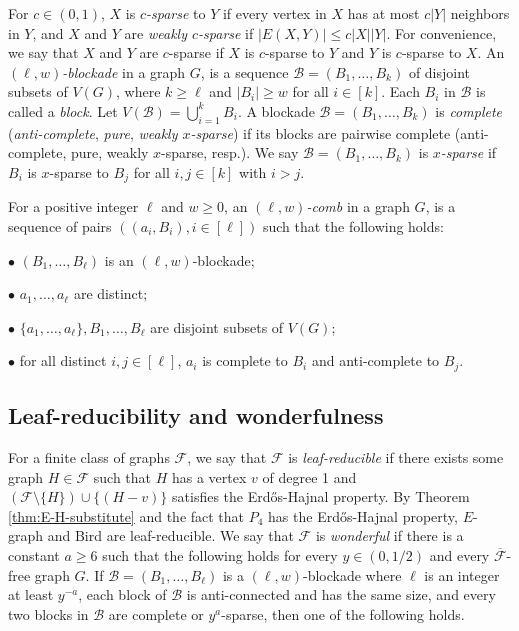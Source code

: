 \documentclass[a4paper,11pt]{article}
\begin{document}
For $c\in(0,1)$, $X$ is {\em $c$-sparse} to $Y$ if every vertex in $X$ has at most $c|Y|$ neighbors in $Y$, and $X$ and $Y$ are {\em weakly $c$-sparse} if $|E(X,Y)|\leq c|X||Y|$. 
For convenience, we say that $X$ and $Y$ are $c$-sparse if $X$ is $c$-sparse to $Y$ and $Y$ is $c$-sparse to $X$.
An {\em $(\ell,w)$-blockade} in a graph $G$, is a sequence $\mathcal{B}=(B_1,\ldots,B_k)$ of disjoint subsets of $V(G)$, where $k\geq \ell$ and $|B_i|\geq w$ for all $i\in[k]$. 
Each $B_i$ in  $\mathcal{B}$ is called a {\em block}.
Let $V(\mathcal{B})=\bigcup_{i=1}^{k} B_i$.
A blockade $\mathcal{B}=(B_1,\ldots,B_k)$ is {\em complete} ({\em anti-complete}, {\em pure}, {\em weakly $x$-sparse}) if its blocks are pairwise complete (anti-complete, pure, weakly $x$-sparse, resp.). 
We say $\mathcal{B}=(B_1,\ldots,B_k)$ is {\em $x$-sparse} if $B_i$ is $x$-sparse to $B_j$ for all $i,j\in[k]$ with $i>j$.

For a positive integer $\ell$ and $w\geq0$, an {\em $(\ell,w)$-comb} in a graph $G$, is a sequence of pairs $((a_i,B_i),i\in[\ell])$ such that the following holds:

$\bullet$ $(B_1,\ldots,B_\ell)$ is an $(\ell,w)$-blockade;

$\bullet$ $a_1,\ldots,a_\ell$ are distinct;

$\bullet$ $\{a_1,\ldots,a_\ell\}, B_1,\ldots,B_\ell$ are disjoint subsets of $V(G)$;

$\bullet$ for all distinct $i,j\in[\ell]$, $a_i$ is complete to $B_i$ and anti-complete to $B_j$.

\subsection{Leaf-reducibility and wonderfulness}

For a finite class of graphs $\mathcal{F}$, we say that $\mathcal{F}$ is {\em leaf-reducible} if there exists some graph $H\in \mathcal{F}$ such that $H$ has a vertex $v$ of degree 1 and $(\mathcal{F}\setminus \{H\})\cup \{(H-v)\}$ satisfies the Erd\H{o}s-Hajnal property.
By Theorem \ref{thm:E-H-substitute} and the fact that $P_4$ has the Erd\H{o}s-Hajnal property, $E$-graph and Bird are leaf-reducible.
We say that $\mathcal{F}$ is {\em wonderful} if there is a constant $a\geq 6$ such that the following holds for every $y\in (0,1/2)$ and every $\overline{\mathcal{F}}$-free graph $G$.
If $\mathcal{B}=(B_1,\ldots,B_\ell)$ is a $(\ell,w)$-blockade where $\ell$ is an integer at least $y^{-a}$, each block of $\mathcal{B}$ is anti-connected and has the same size, and every two blocks in $\mathcal{B}$ are complete or $y^{a}$-sparse, then one of the following holds.
\end{document}
